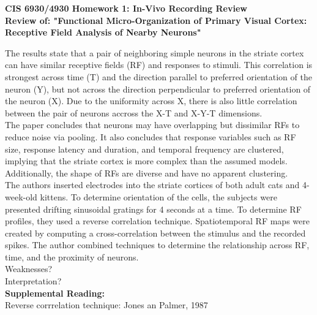 \documentclass[11pt]{article}
\begin{document}
\begin{center}
{\large {\bf CIS 6930/4930 Homework 1: In-Vivo Recording Review}}\\
{\normalsize {\bf Review of: "Functional Micro-Organization of Primary Visual Cortex: Receptive
Field Analysis of Nearby Neurons"}}
\end{center}

The results state that a pair of neighboring simple neurons in the striate cortex
can have similar receptive fields (RF) and responses to stimuli.  This correlation is
strongest across time (T) and the direction parallel to preferred orientation of
the neuron (Y), but not across the direction perpendicular to preferred orientation
of the neuron (X).  Due to the uniformity across X, there is also little correlation
between the pair of neurons accross the X-T and X-Y-T dimensions.\\

The paper concludes that neurons may have overlapping but dissimilar RFs to reduce
noise via pooling. It also concludes that response variables such as RF size, response
latency and duration, and temporal frequency are clustered, implying that the striate
cortex is more complex than the assumed models.  Additionally, the shape of RFs are
diverse and have no apparent clustering. \\

The authors inserted electrodes into the striate cortices of both adult cats and
4-week-old kittens.  To determine orientation of the cells, the subjects were presented
drifting sinusoidal gratings for 4 seconds at a time.  To determine RF profiles,
they used a reverse correlation technique.  Spatiotemporal RF maps were created
by computing a cross-correlation between the stimulus and the recorded spikes.
The author combined techniques to determine the relationship across RF, time, and
the proximity of neurons. \\

Weaknesses? \\

Interpretation? \\

{\bf Supplemental Reading: } \\
Reverse corrrelation technique: Jones an Palmer, 1987 \\
\end{document}
